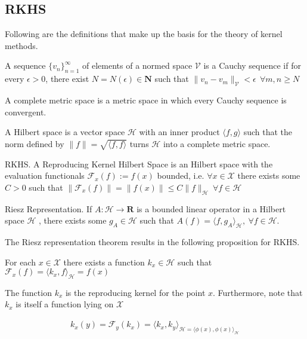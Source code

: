 \subsection{RKHS}
Following are the definitions that make up the basis for the theory of kernel methods.


\begin{definition}
    A sequence $\{v_n\}_{n=1}^{\infty}$ of elements of a normed space $\mathcal{V}$ is a Cauchy sequence if for every $\epsilon>0$, there exist $N=N(\epsilon) \in \mathbf{N}$ such that $\|v_n-v_m\|_{\mathcal{V}}<\epsilon \ \ \forall m,n\geq N$  
\end{definition}


\begin{definition}
    A complete metric space is a metric space in which every Cauchy sequence is convergent.
\end{definition}


\begin{definition}
    A Hilbert space is a vector space $\mathcal{H}$ with an inner product $\langle f, g \rangle$ such that the norm defined by $\|f\|=\sqrt{\langle f, f \rangle}$
turns $\mathcal{H}$ into a complete metric space.
\end{definition}

\begin{definition}
    RKHS.
    A Reproducing Kernel Hilbert Space is an Hilbert space with the evaluation functionals $\mathcal{F}_{x}(f):=f(x)$ bounded, i.e. $\forall x \in \mathcal{X}$ there exists some $C>0$ such that $\| \mathcal{F}_{x}(f)\|=\|f(x)\| \leq C \|f\|_{\mathcal{H}} \ \forall f \in \mathcal{H}$
\end{definition}


\begin{theorem}
    Riesz Representation. If $A : \mathcal{H} \rightarrow \mathbf{R}$ is a bounded linear operator in a Hilbert space $\mathcal{H}$ , there exists some $g_{A} \in \mathcal{H}$ such that $A(f) = \langle f,g_A\rangle_\mathcal{H}, \ \forall f \in \mathcal{H}$.
\end{theorem}


The Riesz representation theorem results in the following proposition for RKHS.
\begin{proposition}
For each $x \in \mathcal{X}$ there exists a function $k_{x} \in \mathcal{H}$ such that $\mathcal{F}_{x}(f)=\langle k_{x}, f\rangle_{\mathcal{H}}=f(x)$    
\end{proposition}

The function $k_{x}$ is the reproducing kernel for the point $x$.
Furthermore, note that $k_{x}$ is itself a function lying on $\mathcal{X}$

\begin{align*}
    k_{x}(y)=\mathcal{F}_{y}(k_{x})=\langle k_{x}, k_{y}\rangle_{\mathcal{H}=\langle \phi(x), \phi(x)\rangle_{\mathcal{H}}}
\end{align*}







